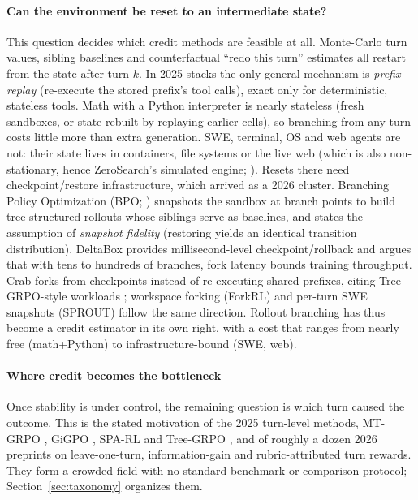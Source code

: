 \paragraph{Can the environment be reset to an intermediate state?}
This question decides which credit methods are feasible at all. Monte-Carlo turn values, sibling baselines and counterfactual ``redo this turn'' estimates all restart from the state after turn $k$. In 2025 stacks the only general mechanism is \emph{prefix replay} (re-execute the stored prefix's tool calls), exact only for deterministic, stateless tools. Math with a Python interpreter is nearly stateless (fresh sandboxes, or state rebuilt by replaying earlier cells), so branching from any turn costs little more than extra generation. SWE, terminal, OS and web agents are not: their state lives in containers, file systems or the live web (which is also non-stationary, hence ZeroSearch's simulated engine; \citealp{sun2025zerosearch}). Resets there need checkpoint/restore infrastructure, which arrived as a 2026 cluster. Branching Policy Optimization (BPO; \citealp{bpo2026branching}) snapshots the sandbox at branch points to build tree-structured rollouts whose siblings serve as baselines, and states the assumption of \emph{snapshot fidelity} (restoring yields an identical transition distribution). DeltaBox \citep{deltabox2026} provides millisecond-level checkpoint/rollback and argues that with tens to hundreds of branches, fork latency bounds training throughput. Crab \citep{crab2026} forks from checkpoints instead of re-executing shared prefixes, citing Tree-GRPO-style workloads \citep{ji2025tree}; workspace forking (ForkRL) and per-turn SWE snapshots (SPROUT) follow the same direction\unverified. Rollout branching has thus become a credit estimator in its own right, with a cost that ranges from nearly free (math+Python) to infrastructure-bound (SWE, web).

\paragraph{Where credit becomes the bottleneck}
Once stability is under control, the remaining question is which turn caused the outcome. This is the stated motivation of the 2025 turn-level methods, MT-GRPO \citep{wei2025reinforcing}, GiGPO \citep{feng2025group}, SPA-RL \citep{wang2025spa} and Tree-GRPO \citep{ji2025tree}, and of roughly a dozen 2026 preprints on leave-one-turn, information-gain and rubric-attributed turn rewards\unverified. They form a crowded field with no standard benchmark or comparison protocol; Section~\ref{sec:taxonomy} organizes them.
